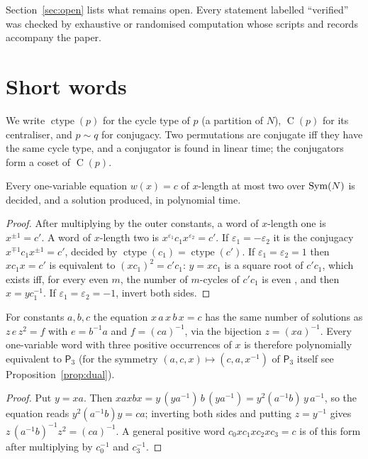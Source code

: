 \documentclass[preprint,12pt]{elsarticle}
\theoremstyle{definition}\newtheorem{defi}[thm]{Definition}\newtheorem{prob}[thm]{Problem}\newtheorem{obs}[thm]{Observation}
\theoremstyle{remark}\newtheorem{rem}[thm]{Remark}
\newcommand{\ctype}{\operatorname{ctype}}\DeclareMathOperator{\Cent}{C}\DeclareMathOperator{\supp}{supp}
\newcommand{\Pthree}{\mathsf{P}_3}\newcommand{\Conj}[1]{\mathsf{Conj}_{#1}}\newcommand{\Dzero}{\Conj{3}}\newcommand{\TR}{T_{\mathcal R}}
\begin{document}
Section~\ref{sec:open} lists what remains open. Every statement labelled ``verified'' was checked by exhaustive or randomised computation whose scripts and records accompany the paper.

\section{Short words}\label{sec:short}

We write $\ctype(p)$ for the cycle type of $p$ (a partition of $N$), $\Cent(p)$ for its centraliser, and $p\sim q$ for conjugacy. Two permutations are conjugate iff they have the same cycle type, and a conjugator is found in linear time; the conjugators form a coset of $\Cent(p)$.

\begin{prop}\label{prop:short}
Every one-variable equation $w(x)=c$ of $x$-length at most two over $\operatorname{Sym}(N)$ is decided, and a solution produced, in polynomial time.
\end{prop}
\begin{proof}
After multiplying by the outer constants, a word of $x$-length one is $x^{\pm1}=c'$. A word of $x$-length two is $x^{\varepsilon_1}c_1x^{\varepsilon_2}=c'$. If $\varepsilon_1=-\varepsilon_2$ it is the conjugacy $x^{\mp1}c_1x^{\pm1}=c'$, decided by $\ctype(c_1)=\ctype(c')$. If $\varepsilon_1=\varepsilon_2=1$ then $xc_1x=c'$ is equivalent to $(xc_1)^{2}=c'c_1$: $y=xc_1$ is a square root of $c'c_1$, which exists iff, for every even $m$, the number of $m$-cycles of $c'c_1$ is even \cite{blum1974}, and then $x=yc_1^{-1}$. If $\varepsilon_1=\varepsilon_2=-1$, invert both sides.
\end{proof}

\begin{prop}\label{prop:three}
For constants $a,b,c$ the equation $x\,a\,x\,b\,x=c$ has the same number of solutions as $z\,e\,z^{2}=f$ with $e=b^{-1}a$ and $f=(ca)^{-1}$, via the bijection $z=(xa)^{-1}$. Every one-variable word with three positive occurrences of $x$ is therefore polynomially equivalent to $\Pthree$ (for the symmetry
$(a,c,x)\mapsto(c,a,x^{-1})$ of $\Pthree$ itself see Proposition~\ref{prop:dual}).
\end{prop}
\begin{proof}
Put $y=xa$. Then $xaxbx=y\,(ya^{-1})\,b\,(ya^{-1})=y^{2}(a^{-1}b)\,y\,a^{-1}$, so the equation reads $y^{2}(a^{-1}b)y=ca$; inverting both sides and putting $z=y^{-1}$ gives $z\,(a^{-1}b)^{-1}z^{2}=(ca)^{-1}$. A general positive word $c_0xc_1xc_2xc_3=c$ is of this form after multiplying by $c_0^{-1}$ and $c_3^{-1}$. 
\end{proof}
\end{document}
